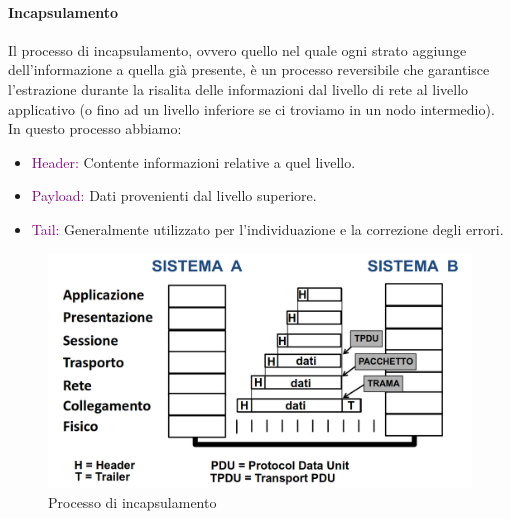 \paragraph{Incapsulamento} Il processo di incapsulamento, ovvero quello nel quale ogni strato aggiunge dell'informazione a quella già presente, è un processo reversibile che garantisce l'estrazione durante la risalita delle informazioni dal livello di rete al livello applicativo (o fino ad un livello inferiore se ci troviamo in un nodo intermedio).
\newline In questo processo abbiamo:
\begin{itemize}
    \item \textcolor{purple}{Header:} Contente informazioni relative a quel livello.
    \item \textcolor{purple}{Payload:} Dati provenienti dal livello superiore.
    \item \textcolor{purple}{Tail:} Generalmente utilizzato per l'individuazione e la correzione degli errori.
\end{itemize}
\newpage
\begin{figure}[h]
    \centering
    \includegraphics[scale=0.30]{Immagini/Incapsulamento-dati.png}
    \caption{Processo di incapsulamento}
\end{figure}


